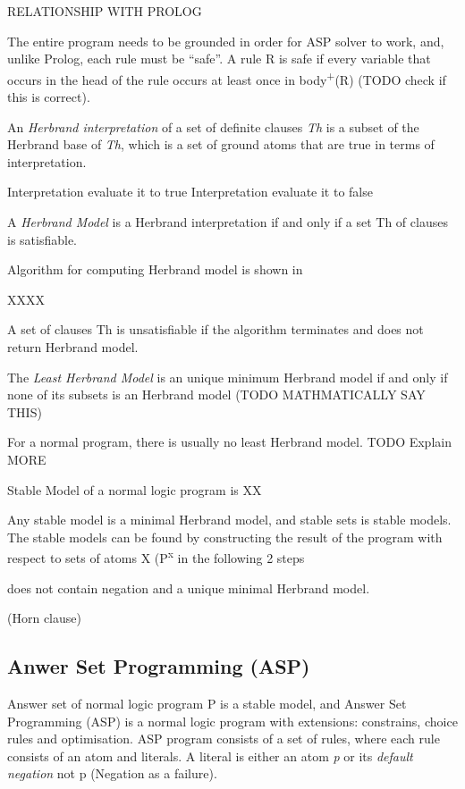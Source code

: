 \documentclass[12pt,twoside]{report}
\begin{document}
RELATIONSHIP WITH PROLOG

The entire program needs to be grounded in order for ASP solver to work, and, unlike Prolog,  each rule must be \enquote{safe}. A rule R is safe if every variable that occurs in the head of the rule occurs at least once in body\textsuperscript{+}(R) (TODO check if this is correct).

An \textit{Herbrand interpretation} of a set of definite clauses \textit{Th} is a subset of the Herbrand base of \textit{Th}, which is a set of ground atoms that are true in terms of interpretation.



Interpretation evaluate it to true
Interpretation evaluate it to false

A \textit{Herbrand Model} is a Herbrand interpretation if and only if a set Th of clauses is satisfiable.


Algorithm for computing Herbrand model is shown in

XXXX

A set of clauses Th is unsatisfiable if the algorithm terminates and does not return Herbrand model.

The \textit{Least Herbrand Model} is an unique minimum Herbrand model if and only if none of its subsets is an Herbrand model (TODO MATHMATICALLY SAY THIS)

For a normal program, there is usually no least Herbrand model.
TODO Explain MORE

Stable Model of a normal logic program is XX
\cite{Gelfond1988}

Any stable model is a minimal Herbrand model, and stable sets is stable models. The stable models can be found by constructing the result of the program with respect to sets of atoms X (P\textsuperscript{x} in the following 2 steps



does not contain negation and a unique minimal Herbrand model.

\begin{examp} (Horn clause)

\end{examp}


\subsection{Anwer Set Programming (ASP)}

Answer set of normal logic program P is a stable model, and Answer Set Programming (ASP) is a normal logic program with extensions: constrains, choice rules and optimisation. ASP program consists of a set of rules, where each rule consists of an atom and literals.
A literal is either an atom \textit{p} or its \textit{default negation} not p (Negation as a failure).
\end{document}

